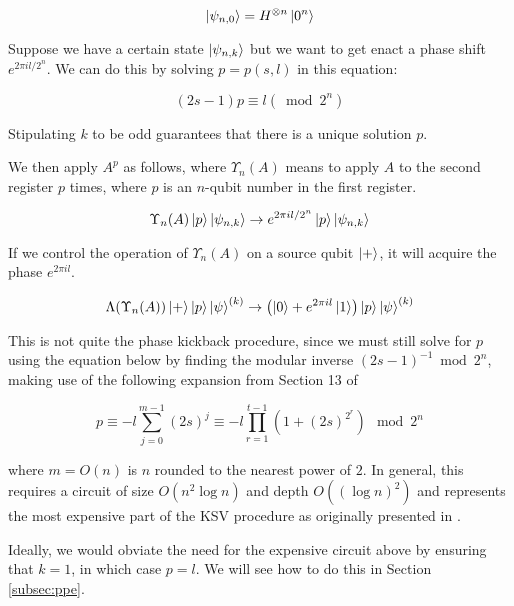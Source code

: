 \begin{displaymath}
\left\vert{\psi_{n,0}}\right\rangle = H^{\otimes n}\left\vert{0^n}\right\rangle
\end{displaymath}

Suppose we have a certain state $\left\vert{\psi_{n,k}}\right\rangle$ but we want to get enact
a phase shift $e^{2\pi i l / 2^n}$. We can do this by solving $p=p(s,l)$
in this equation:

\begin{equation}
\label{eqn:psl}
(2s-1)p \equiv l (\bmod 2^n)
\end{equation}

Stipulating $k$ to be odd guarantees that there is a unique solution $p$.

We then apply $A^p$ as follows, where $\Upsilon_n(A)$ means to
apply $A$ to the second register $p$ times, where $p$ is an $n$-qubit
number in the first register.

\begin{equation}
\label{eqn:upsilon}
\Upsilon_n(A) \left\vert{p}\right\rangle\left\vert{\psi_{n,k}}\right\rangle \rightarrow
e^{2\pi i l/2^n} \left\vert{p}\right\rangle\left\vert{\psi_{n,k}}\right\rangle
\end{equation}

If we control the operation of $\Upsilon_n(A)$ on a source qubit $\left\vert{+}\right\rangle$,
it will acquire the phase $e^{2\pi i l}$.

\begin{equation}
\Lambda(\Upsilon_n(A))\left\vert{+}\right\rangle\left\vert{p}\right\rangle\left\vert{\psi}\right\rangle^{(k)} \rightarrow
\left( \left\vert{0}\right\rangle + e^{2\pi i l}\left\vert{1}\right\rangle \right) \left\vert{p}\right\rangle\left\vert{\psi}\right\rangle^{(k)}
\end{equation}

This is not quite the phase kickback procedure, since
we must still solve for $p$ using the equation below by finding the
modular inverse $(2s - 1)^{-1} \bmod 2^n$,
making use of the following expansion from Section 13
of \cite{Kitaev2002}

\begin{equation}
p \equiv -l\sum_{j=0}^{m-1} (2s)^j \equiv -l \prod_{r=1}^{t-1}\left(1 + (2s)^{2^r}\right) \mod 2^n
\end{equation}

where $m = O(n)$ is $n$ rounded to the nearest power of $2$.  In general,
this requires a circuit of size $O(n^2 \log n)$ and depth $O((\log n)^2)$ and
represents the most expensive part of the KSV procedure as originally
presented in \cite{Kitaev2002}.

Ideally, we would obviate the need for the expensive circuit above
by ensuring that $k=1$, in which case
$p = l$. We will see how to do this in Section \ref{subsec:ppe}.

